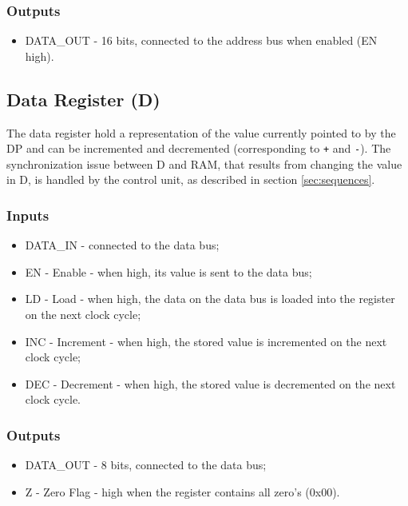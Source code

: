 \subsubsection*{Outputs}
\begin{itemize}
\itemsep0em   
\item DATA\_OUT - 16 bits, connected to the address bus when enabled (EN high).
\end{itemize}

\subsection{Data Register (D)} \label{sec:architecture:d}
The data register hold a representation of the value currently pointed to by the DP and can be incremented and decremented (corresponding to \texttt{+} and \texttt{-}). The synchronization issue between D and RAM, that results from changing the value in D, is handled by the control unit, as described in section \ref{sec:sequences}.

\subsubsection*{Inputs}
\begin{itemize}
\itemsep0em   
\item DATA\_IN - connected to the data bus;
\item EN - Enable - when high, its value is sent to the data bus;
\item LD - Load - when high, the data on the data bus is loaded into the register on the next clock cycle;
\item INC - Increment - when high, the stored value is incremented on the next clock cycle;
\item DEC - Decrement - when high, the stored value is decremented on the next clock cycle.
\end{itemize}

\subsubsection*{Outputs}
\begin{itemize}
\itemsep0em 
\item DATA\_OUT - 8 bits, connected to the data bus;
\item Z - Zero Flag - high when the register contains all zero's (0x00).
\end{itemize}


